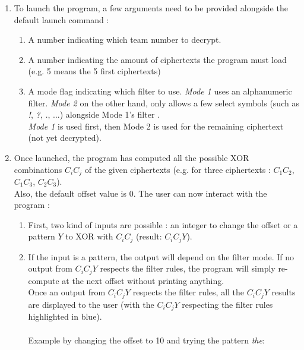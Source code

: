 \documentclass[a4paper,11pt]{article}
\begin{document}
\begin{enumerate}

  \item To launch the program, a few arguments need to be provided alongside the default launch command :
  
  \begin{enumerate}
    \item A number indicating which team number to decrypt.
    \item A number indicating the amount of ciphertexts the program must load (e.g. 5 means the 5 first ciphertexts)
    \item A mode flag indicating which filter to use. \textit{Mode 1} uses an alphanumeric filter. \textit{Mode 2} on the other hand, only allows a few select symbols (such as \textit{!}, \textit{?}, \textit{.}, ...) alongside Mode 1's filter . \\
    \textit{Mode 1} is used first, then Mode 2 is used for the remaining ciphertext (not yet decrypted).
  \end{enumerate}

\newpage

  \item Once launched, the program has computed all the possible XOR combinations $C_{i}C_{j}$ of the given ciphertexts (e.g. for three ciphertexts : $C_{1}C_{2}$, $C_{1}C_{3}$, $C_{2}C_{3}$). \\ Also, the default offset value is $0$. The user can now interact with the program : 

  \begin{enumerate}
    \item First, two kind of inputs are possible : an integer to change the offset or a pattern $Y$ to XOR with $C_{i}C_{j}$ (result: $C_{i}C_{j}Y$).
    \item If the input is a pattern, the output will depend on the filter mode. If no output from $C_{i}C_{j}Y$ respects the filter rules, the program will simply re-compute at the next offset without printing anything. \\
    Once an output from $C_{i}C_{j}Y$ respects the filter rules, all the $C_{i}C_{j}Y$ results are displayed to the user (with the $C_{i}C_{j}Y$ respecting the filter rules highlighted in blue). \\
    \\
    Example by changing the offset to 10 and trying the pattern \textit{the}:
	

\end{enumerate}
\end{enumerate}
\end{document}
